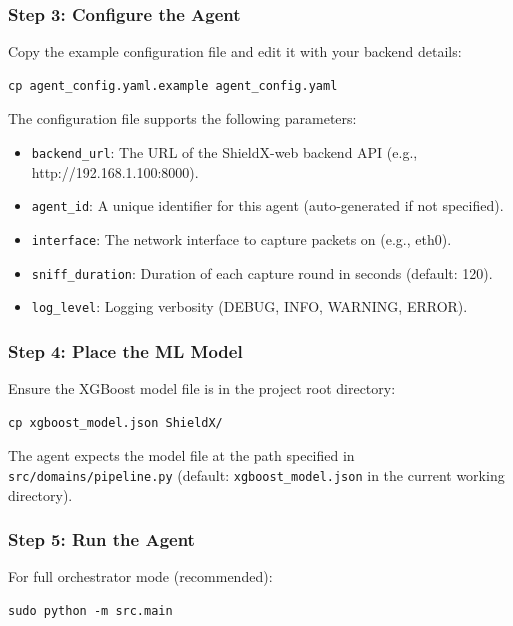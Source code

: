 \documentclass[../Main.tex]{subfiles}
\begin{document}
\subsubsection{Step 3: Configure the Agent}

Copy the example configuration file and edit it with your backend details:

\begin{verbatim}
cp agent_config.yaml.example agent_config.yaml
\end{verbatim}

The configuration file supports the following parameters:

\begin{itemize}
    \item \texttt{backend\_url}: The URL of the ShieldX-web backend API (e.g., http://192.168.1.100:8000).
    \item \texttt{agent\_id}: A unique identifier for this agent (auto-generated if not specified).
    \item \texttt{interface}: The network interface to capture packets on (e.g., eth0).
    \item \texttt{sniff\_duration}: Duration of each capture round in seconds (default: 120).
    \item \texttt{log\_level}: Logging verbosity (DEBUG, INFO, WARNING, ERROR).
\end{itemize}

\subsubsection{Step 4: Place the ML Model}

Ensure the XGBoost model file is in the project root directory:

\begin{verbatim}
cp xgboost_model.json ShieldX/
\end{verbatim}

The agent expects the model file at the path specified in \texttt{src/domains/pipeline.py} (default: \texttt{xgboost\_model.json} in the current working directory).

\subsubsection{Step 5: Run the Agent}

For full orchestrator mode (recommended):

\begin{verbatim}
sudo python -m src.main
\end{verbatim}
\end{document}
